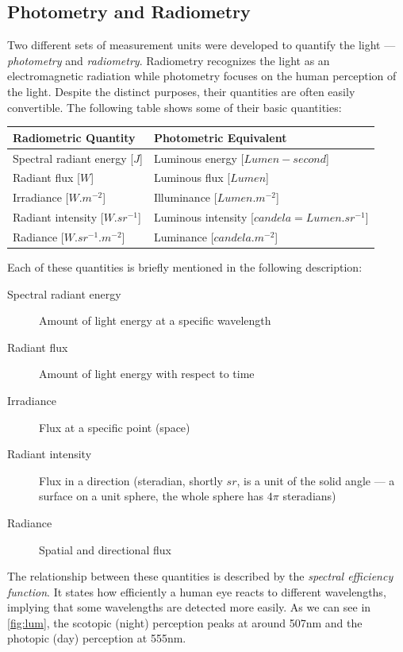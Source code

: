 \subsection{Photometry and Radiometry}

Two different sets of measurement units were developed to quantify the light --- \emph{photometry} and \emph{radiometry}. Radiometry recognizes the light as an electromagnetic radiation while photometry focuses on the human perception of the light. Despite the distinct purposes, their quantities are often easily convertible. The following table shows some of their basic quantities:

\begin{tabular}{ll}
	\hline
	\textbf{Radiometric Quantity} & \textbf{Photometric Equivalent} \\
	\hline \hline
	Spectral radiant energy [$J$] & Luminous energy [$Lumen-second$] \\
	\hline
	Radiant flux [$W$] & Luminous flux [$Lumen$] \\
	\hline
	Irradiance [$W.m^{-2}$] & Illuminance [$Lumen.m^{-2}$]  \\
	\hline
	Radiant intensity [$W.sr^{-1}$] & Luminous intensity [$candela=Lumen.sr^{-1}$] \\
	\hline
	Radiance [$W.sr^{-1}.m^{-2}$] & Luminance [$candela.m^{-2}$]
\end{tabular}

Each of these quantities is briefly mentioned in the following description:
\begin{description}
	\item[Spectral radiant energy] Amount of light energy at a specific wavelength
	\item[Radiant flux] Amount of light energy with respect to time
	\item[Irradiance] Flux at a specific point (space)
	\item[Radiant intensity] Flux in a direction (steradian, shortly $sr$, is a unit of the solid angle --- a surface on a unit sphere, the whole sphere has $4\pi$ steradians)
	\item[Radiance] Spatial and directional flux
\end{description}

The relationship between these quantities is described by the \emph{spectral efficiency function}. It states how efficiently a human eye reacts to different wavelengths, implying that some wavelengths are detected more easily. As we can see in \autoref{fig:lum}, the scotopic (night) perception peaks at around 507nm and the photopic (day) perception at 555nm.

